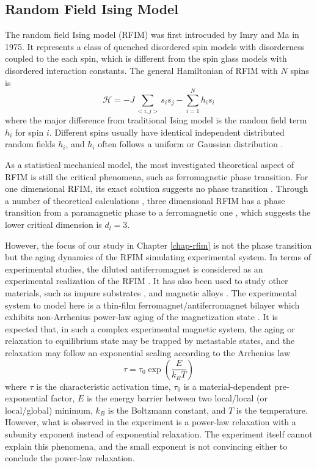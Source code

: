\subsection{Random Field Ising Model}
\label{sec:intro-rfim}
The random field Ising model (RFIM) was first introcuded by Imry and Ma \cite{imry1975random} in 1975. It represents a class of quenched disordered spin models \cite{young1997spin} with  disorderness coupled to the each spin, which is different from the spin glass models with disordered interaction constants. The general Hamiltonian of RFIM with $N$ spins is
\begin{equation}
\mathcal{H}=-J\sum_{<i,j>}s_{i}s_{j}-\sum_{i=1}^{N}h_{i}s_{i}
\end{equation}
where the major difference from traditional Ising model is the random field term $h_i$ for spin $i$. Different spins usually have  identical independent distributed random fields $h_i$, and $h_i$ often follows a uniform \cite{nattermann1997theory} or Gaussian distribution \cite{newman1999}.

As a statistical mechanical model, the most investigated theoretical aspect of RFIM is still the critical phenomena, such as ferromagnetic phase transition. For one dimensional RFIM, its exact solution suggests no phase transition \cite{grinstein1983exact}. Through a number of theoretical calculations \cite{parisi1979random, bricmont1987lower}, three dimensional RFIM has a phase transition from a paramagnetic phase to a ferromagnetic one  \cite{bricmont1987lower}, which suggests the lower critical dimension is $d_l = 3$. 

However, the focus of our study in Chapter \ref{chap-rfim} is not the phase transition but the aging dynamics of the RFIM simulating experimental system. In terms of experimental studies, the diluted antiferromagnet is considered as an experimental realization of the RFIM \cite{belanger1985, fernandez1988random}. It has also been used to study other materials, such as  impure substrates \cite{villain1982commensurate}, and magnetic alloys \cite{fisher1988theory}. 
The experimental system to model here is a thin-film ferromagnet/antiferromagnet bilayer which exhibits non-Arrhenius power-law aging of the magnetization state \cite{ma2016prb}. 
It is expected that, in such a complex experimental magnetic system, the aging or relaxation to equilibrium state may be trapped by metastable states, and the relaxation may follow an exponential scaling according to the Arrhenius law \cite{Arrhenius1989}
\begin{equation}
\tau = \tau_0 \exp \left( \frac{E}{k_B T}\right)
\end{equation}
where $\tau$ is the characteristic activation time, $\tau_0$ is a material-dependent pre-exponential factor, $E$ is the energy barrier between two local/local (or local/global) minimum, $k_B$ is the Boltzmann constant, and $T$ is the temperature. However, what is observed in the experiment is a power-law relaxation with a subunity exponent instead of exponential relaxation. The experiment itself cannot explain this phenomena, and the small exponent is not convincing either to conclude the power-law relaxation. 

